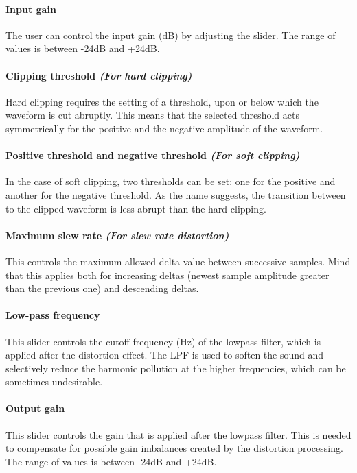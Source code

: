 \documentclass{article}
\begin{document}
\paragraph{Input gain} The user can control the input gain (dB) by adjusting the slider. The range of values is between -24dB and +24dB.
\paragraph{Clipping threshold \textit{(For hard clipping)}} Hard clipping requires the setting of a threshold, upon or below which the waveform is cut abruptly. This means that the selected threshold acts symmetrically for the positive and the negative amplitude of the waveform.
\paragraph{Positive threshold and negative threshold \textit{(For soft clipping)}} In the case of soft clipping, two thresholds can be set: one for the positive and another for the negative threshold. As the name suggests, the transition between to the clipped waveform is less abrupt than the hard clipping.
\paragraph{Maximum slew rate \textit{(For slew rate distortion)}}
This controls the maximum allowed delta value between successive samples. Mind that this applies both for increasing deltas (newest sample amplitude greater than the previous one) and descending deltas.  
\paragraph{Low-pass frequency} This slider controls the cutoff frequency (Hz) of the lowpass filter, which is applied after the distortion effect. The LPF is used to soften the sound and selectively reduce the harmonic pollution at the higher frequencies, which can be sometimes undesirable.
\paragraph{Output gain} This slider controls the gain that is applied after the lowpass filter. This is needed to compensate for possible gain imbalances created by the distortion processing. The range of values is between -24dB and +24dB.



\end{document}
